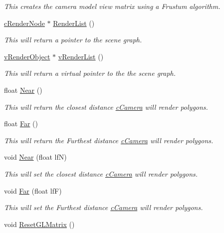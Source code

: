 \begin{DoxyCompactItemize}
\begin{DoxyCompactList}\small\item\em This creates the camera model view matrix using a Frustum algorithm. \item\end{DoxyCompactList}\item 
\hyperlink{classc_render_node}{cRenderNode} $\ast$ \hyperlink{classc_camera_a4791120acbffeb5e5731afbc4576496d}{RenderList} ()
\begin{DoxyCompactList}\small\item\em This will return a pointer to the scene graph. \item\end{DoxyCompactList}\item 
\hyperlink{classv_render_object}{vRenderObject} $\ast$ \hyperlink{classc_camera_a02bce34af198d7ef317b459f19b25a40}{vRenderList} ()
\begin{DoxyCompactList}\small\item\em This will return a virtual pointer to the the scene graph. \item\end{DoxyCompactList}\item 
float \hyperlink{classc_camera_a6bb0b4400645f5431210fe9a43285648}{Near} ()
\begin{DoxyCompactList}\small\item\em This will return the closest distance \hyperlink{classc_camera}{cCamera} will render polygons. \item\end{DoxyCompactList}\item 
float \hyperlink{classc_camera_a85299842bed0c95fca12deee1d94957b}{Far} ()
\begin{DoxyCompactList}\small\item\em This will return the Furthest distance \hyperlink{classc_camera}{cCamera} will render polygons. \item\end{DoxyCompactList}\item 
void \hyperlink{classc_camera_a323f0c3b5827a3f9ea61cb47202c09f9}{Near} (float lfN)
\begin{DoxyCompactList}\small\item\em This will set the closest distance \hyperlink{classc_camera}{cCamera} will render polygons. \item\end{DoxyCompactList}\item 
void \hyperlink{classc_camera_ab8e772b148a2539cb1b7ec384f02a386}{Far} (float lfF)
\begin{DoxyCompactList}\small\item\em This will set the Furthest distance \hyperlink{classc_camera}{cCamera} will render polygons. \item\end{DoxyCompactList}\item 
void \hyperlink{classc_camera_a5ca3028008da0c7941993dcfc49b9591}{ResetGLMatrix} ()
\end{DoxyCompactItemize}

